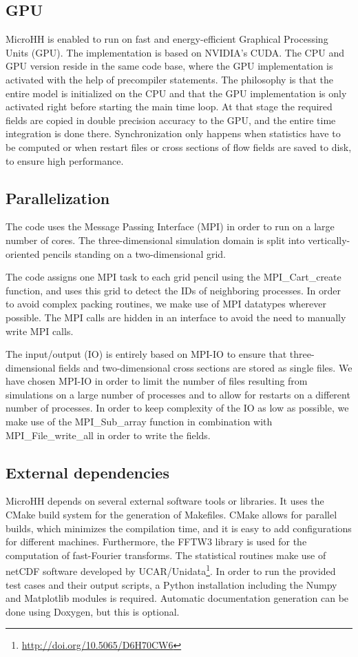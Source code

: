 \documentclass[gmd]{copernicus}
\begin{document}
\subsection{GPU}
MicroHH is enabled to run on fast and energy-efficient Graphical Processing Units (GPU). The implementation is based on NVIDIA's CUDA. The CPU and GPU version reside in the same code base, where the GPU implementation is activated with the help of precompiler statements. The philosophy is that the entire model is initialized on the CPU and that the GPU implementation is only activated right before starting the main time loop. At that stage the required fields are copied in double precision accuracy to the GPU, and the entire time integration is done there. Synchronization only happens when statistics have to be computed or when restart files or cross sections of flow fields are saved to disk, to ensure high performance.

\subsection{Parallelization}
The code uses the Message Passing Interface (MPI) in order to run on a large number of cores. The three-dimensional simulation domain is split into vertically-oriented pencils standing on a two-dimensional grid.

The code assigns one MPI task to each grid pencil using the MPI\_Cart\_create function, and uses this grid to detect the IDs of neighboring processes. In order to avoid complex packing routines, we make use of MPI datatypes wherever possible. The MPI calls are hidden in an interface to avoid the need to manually write MPI calls.

The input/output (IO) is entirely based on MPI-IO to ensure that three-dimensional fields and two-dimensional cross sections are stored as single files. We have chosen MPI-IO in order to limit the number of files resulting from simulations on a large number of processes and to allow for restarts on a different number of processes. In order to keep complexity of the IO as low as possible, we make use of the MPI\_Sub\_array function in combination with MPI\_File\_write\_all in order to write the fields.

\subsection{External dependencies}
MicroHH depends on several external software tools or libraries. It uses the CMake build system for the generation of Makefiles. CMake allows for parallel builds, which minimizes the compilation time, and it is easy to add configurations for different machines. Furthermore, the FFTW3 library \citep{Frigo2005} is used for the computation of fast-Fourier transforms. The statistical routines make use of netCDF software developed by UCAR/Unidata\footnote{\url{http://doi.org/10.5065/D6H70CW6}}. In order to run the provided test cases and their output scripts, a Python installation including the Numpy and Matplotlib modules is required. Automatic documentation generation can be done using Doxygen, but this is optional.
\end{document}
